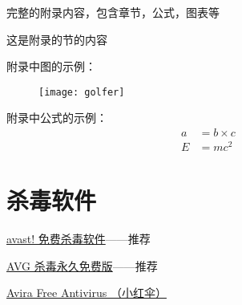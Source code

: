 
\appendix

完整的附录内容，包含章节，公式，图表等

这是附录的节的内容

附录中图的示例：
\begin{figure}[htbp]
\centering
\texttt{[image: golfer]}
\vspace{-1em}
\end{figure}

附录中公式的示例：
\begin{align}
a & = b \times c \\
E & = m c^2
\end{align}

\section*{杀毒软件}
\href{http://www.avast.com/zh-cn/free-antivirus-download}{avast! 免费杀毒软件}——推荐

\href{http://www.avg.com/cn-zh/china-avg-antivirus-free}{AVG 杀毒永久免费版}——推荐

\href{http://www.avira.com/en/avira-free-antivirus}{Avira Free Antivirus （小红伞）}









